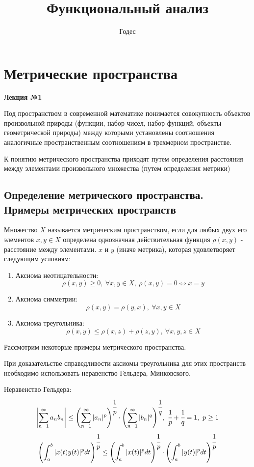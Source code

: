 \documentclass[14pt,a4paper]{extarticle}
\title{\textbf{Функциональный анализ}}
\author{Годес}
\date{}
\theoremstyle{definition}
\theoremstyle{remark}
\newcommand{\be}{\begin{enumerate}}
\newcommand{\ee}{\end{enumerate}}
\newcommand{\sep}{ , \ \allowbreak }
\renewcommand{\[}{\begin{dmath*}[compact]}
\renewcommand{\]}{\end{dmath*}}
\begin{document}
\sloppy
\maketitle

\tableofcontents

\section{Метрические пространства} \label{sec:mp}

\textbf{Лекция №1}

Под пространством в современной математике понимается совокупность объектов
произвольной природы (функции, набор чисел, набор функций, объекты
геометрической природы) между которыми установлены соотношения аналогичные
пространственным соотношениям в трехмерном пространстве.

К понятию метрического пространства приходят путем определения расстояния между
элементами произвольного множества (путем определения метрики)

\subsection{Определение метрического пространства. Примеры метрических пространств}

Множество $X$ называется метрическим пространством, если для любых двух его
элементов $x, y \in X$ определена однозначная действительная функция
$\rho(x, y)$ - расстояние между элементами.
$x$ и $y$ (иначе метрика), которая удовлетворяет следующим условиям:

\be
  \item Аксиома неотицательности:
  \[ \rho(x, y) \geq 0 \sep {\forall x, y \in X} \sep
  {\rho(x, y) = 0} \Leftrightarrow {x = y} \]
  \item Аксиома симметрии:
  \[\rho(x, y) = \rho(y, x) \sep {\forall x, y \in X}\]
  \item Аксиома треугольника:
  \[\rho(x, y) \leq \rho(x, z) + \rho(z, y) \sep {\forall x, y, z \in X}\]
\ee

Рассмотрим некоторые примеры метрического пространства.

При доказательстве справедливости аксиомы треугольника для этих пространств
необходимо использовать неравенство Гельдера, Минковского.

Неравенство Гельдера:
\[
  \left|\sum_{n = 1}^\infty a_n b_n\right| \leq\allowbreak
  {\left(\sum_{n = 1}^\infty |a_n|^p\right)^{\cfrac{1}{p}}}\cdot
  {\left(\sum_{n = 1}^\infty |b_n|^q\right)^{\cfrac{1}{q}}}\sep
  {\cfrac{1}{p} + \cfrac{1}{q} = 1} \sep {p \geq 1}
\]
\[
  {\left(\int_a^b |x(t) y(t)|^p dt \right)^{\cfrac{1}{p}}} \leq\allowbreak
  {\left(\int_a^b |x(t)|^p dt \right)^{\cfrac{1}{p}}} \cdot
  {\left(\int_a^b |y(t)|^p dt \right)^{\cfrac{1}{p}}}
\]
\end{document}
